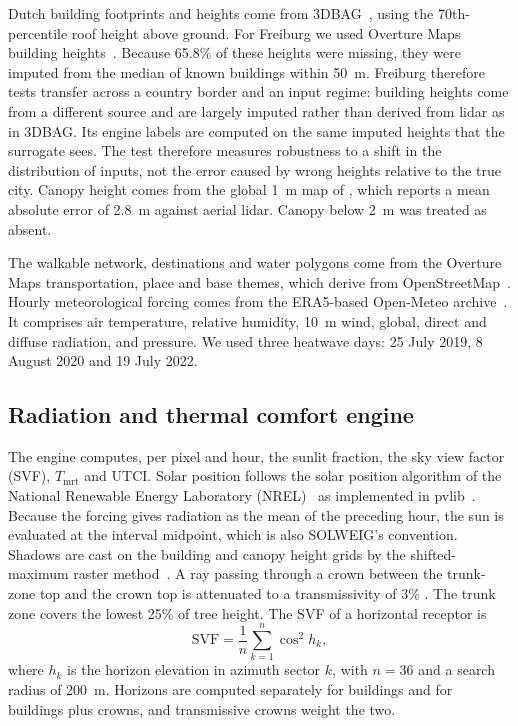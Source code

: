 \documentclass[preprint,12pt,authoryear]{elsarticle}
\newcommand{\tmrt}{\ensuremath{T_\mathrm{mrt}}}
\begin{document}
Dutch building footprints and heights come from 3DBAG~\citep{peters2022}, using the 70th-percentile roof height above ground. For Freiburg we used Overture Maps building heights~\citep{overture2026}. Because 65.8\% of these heights were missing, they were imputed from the median of known buildings within 50~m. Freiburg therefore tests transfer across a country border and an input regime: building heights come from a different source and are largely imputed rather than derived from lidar as in 3DBAG. Its engine labels are computed on the same imputed heights that the surrogate sees. The test therefore measures robustness to a shift in the distribution of inputs, not the error caused by wrong heights relative to the true city. Canopy height comes from the global 1~m map of \citet{tolan2024}, which reports a mean absolute error of 2.8~m against aerial lidar. Canopy below 2~m was treated as absent.

The walkable network, destinations and water polygons come from the Overture Maps transportation, place and base themes, which derive from OpenStreetMap~\citep{overture2026,osm2026}. Hourly meteorological forcing comes from the ERA5-based Open-Meteo archive~\citep{hersbach2020,openmeteo2026}. It comprises air temperature, relative humidity, 10~m wind, global, direct and diffuse radiation, and pressure. We used three heatwave days: 25 July 2019, 8 August 2020 and 19 July 2022.

\subsection{Radiation and thermal comfort engine}\label{sec:engine}

The engine computes, per pixel and hour, the sunlit fraction, the sky view factor (SVF), \tmrt{} and UTCI. Solar position follows the solar position algorithm of the National Renewable Energy Laboratory (NREL)~\citep{reda2004} as implemented in pvlib~\citep{holmgren2018}. Because the forcing gives radiation as the mean of the preceding hour, the sun is evaluated at the interval midpoint, which is also SOLWEIG's convention. Shadows are cast on the building and canopy height grids by the shifted-maximum raster method~\citep{ratti2004}. A ray passing through a crown between the trunk-zone top and the crown top is attenuated to a transmissivity of 3\% \citep{konarska2014}. The trunk zone covers the lowest 25\% of tree height. The SVF of a horizontal receptor is
\begin{equation}
  \mathrm{SVF} = \frac{1}{n}\sum_{k=1}^{n}\cos^{2} h_k ,
\end{equation}
where $h_k$ is the horizon elevation in azimuth sector $k$, with $n = 36$ and a search radius of 200~m. Horizons are computed separately for buildings and for buildings plus crowns, and transmissive crowns weight the two.
\end{document}
